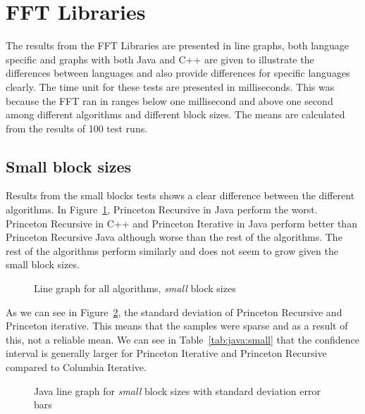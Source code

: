 \section{FFT Libraries}

The results from the FFT Libraries are presented in line graphs, both language specific and graphs with both Java and C++ are given to illustrate the differences between languages and also provide differences for specific languages clearly. The time unit for these tests are presented in milliseconds. This was because the FFT ran in ranges below one millisecond and above one second among different algorithms and different block sizes. The means are calculated from the results of 100 test runs.

\subsection{Small block sizes}
Results from the small blocks tests shows a clear difference between the different algorithms. In Figure~\ref{fig:all:line:small}, Princeton Recursive in Java perform the worst. Princeton Recursive in C++ and Princeton Iterative in Java perform better than Princeton Recursive Java although worse than the rest of the algorithms. The rest of the algorithms perform similarly and does not seem to grow given the small block sizes.




\begin{figure}
    \centering
    
    \caption{Line graph for all algorithms, \emph{small} block sizes}
    \label{fig:all:line:small}
\end{figure}

As we can see in Figure~\ref{fig:java:line:small}, the standard deviation of Princeton Recursive and Princeton iterative. This means that the samples were sparse and as a result of this, not a reliable mean. We can see in Table~\ref{tab:java:small} that the confidence interval is generally larger for Princeton Iterative and Princeton Recursive compared to Columbia Iterative.

\begin{figure}
    \centering
    
    \caption{Java line graph for \emph{small} block sizes with standard deviation error bars}
    \label{fig:java:line:small}
\end{figure}

